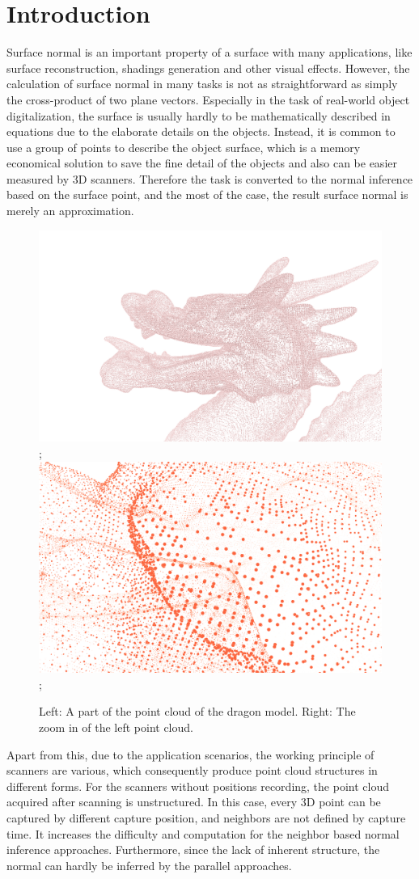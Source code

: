 
\chapter{Introduction} %

\label{ch:introduction} %

Surface normal is an important property of a surface with many applications, like surface reconstruction, shadings generation and other visual effects. However, the calculation of surface normal in many tasks is not as straightforward as simply the cross-product of two plane vectors. Especially in the task of real-world object digitalization, the surface is usually hardly to be mathematically described in equations due to the elaborate details on the objects. Instead, it is common to use a group of points to describe the object surface, which is a memory economical solution to save the fine detail of the objects and also can be easier measured by 3D scanners. Therefore the task is converted to the normal inference based on the surface point, and the most of the case, the result surface normal is merely an approximation. 

\begin{figure}[h!]
	\centering
	{\includegraphics[width=.45\textwidth]{./Figures/point-cloud.png}};
	{\includegraphics[width=.45\textwidth]{./Figures/point-cloud-zoom-in.png}};
	\caption{Left: A part of the point cloud of the dragon model. Right: The zoom in of the left point cloud.}
	\label{fig:point-cloud}
\end{figure}

Apart from this, due to the application scenarios, the working principle of scanners are various, which consequently produce point cloud structures in different forms. For the scanners without positions recording, the point cloud acquired after scanning is unstructured. In this case, every 3D point can be captured by different capture position, and neighbors are not defined by capture time. It increases the difficulty and computation for the neighbor based normal inference approaches.  Furthermore, since the lack of inherent structure, the normal can hardly be inferred by the parallel approaches. 

